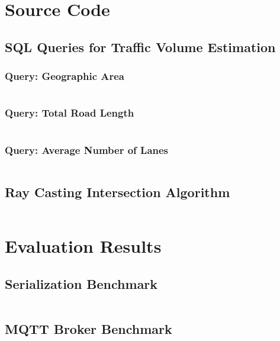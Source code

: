 \chapter{Source Code}
\label{appendix:source_code}

\section{SQL Queries for Traffic Volume Estimation}
\label{sec:appendix:source_code:traffic_volume}

\subsection{Query: Geographic Area}
\inputminted[fontsize=\footnotesize]{sql}{97_listings/traffic_volume_1.sql}

\subsection{Query: Total Road Length}
\inputminted[fontsize=\footnotesize]{sql}{97_listings/traffic_volume_2.sql}

\subsection{Query: Average Number of Lanes}
\inputminted[fontsize=\footnotesize]{sql}{97_listings/traffic_volume_3.sql}

\section{Ray Casting Intersection Algorithm}
\label{sec:appendix:source_code:ray_casting_intersection_algorithm}
\inputminted[fontsize=\footnotesize]{c++}{97_listings/raycast.cu}

\chapter{Evaluation Results}
\section{Serialization Benchmark}
\label{sec:appendix:evaluation_results:serialization_benchmark}
\inputminted[fontsize=\footnotesize]{text}{97_listings/serialization_evaluation.txt}

\section{MQTT Broker Benchmark}
\label{sec:appendix:evaluation_results:mqtt_broker_benchmark}
\inputminted[fontsize=\footnotesize]{text}{97_listings/mqtt_bench.txt}